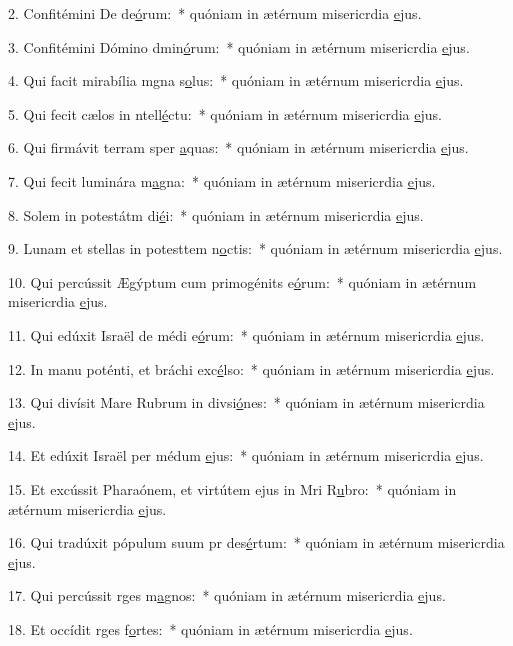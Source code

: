 2. Confitémini De de\uline{ó}rum:~* quóniam in ætérnum misericrdia \uline{e}jus.\par 
3. Confitémini Dómino dmin\uline{ó}rum:~* quóniam in ætérnum misericrdia \uline{e}jus.\par 
4. Qui facit mirabília mgna s\uline{o}lus:~* quóniam in ætérnum misericrdia \uline{e}jus.\par 
5. Qui fecit cælos in ntell\uline{é}ctu:~* quóniam in ætérnum misericrdia \uline{e}jus.\par 
6. Qui firmávit terram sper \uline{a}quas:~* quóniam in ætérnum misericrdia \uline{e}jus.\par 
7. Qui fecit luminára m\uline{a}gna:~* quóniam in ætérnum misericrdia \uline{e}jus.\par 
8. Solem in potestátm di\uline{é}i:~* quóniam in ætérnum misericrdia \uline{e}jus.\par 
9. Lunam et stellas in potesttem n\uline{o}ctis:~* quóniam in ætérnum misericrdia \uline{e}jus.\par 
10. Qui percússit Ægýptum cum primogénits e\uline{ó}rum:~* quóniam in ætérnum misericrdia \uline{e}jus.\par 
11. Qui edúxit Israël de médi e\uline{ó}rum:~* quóniam in ætérnum misericrdia \uline{e}jus.\par 
12. In manu poténti, et bráchi exc\uline{é}lso:~* quóniam in ætérnum misericrdia \uline{e}jus.\par 
13. Qui divísit Mare Rubrum in divsi\uline{ó}nes:~* quóniam in ætérnum misericrdia \uline{e}jus.\par 
14. Et edúxit Israël per médum \uline{e}jus:~* quóniam in ætérnum misericrdia \uline{e}jus.\par 
15. Et excússit Pharaónem, et virtútem ejus in Mri R\uline{u}bro:~* quóniam in ætérnum misericrdia \uline{e}jus.\par 
16. Qui tradúxit pópulum suum pr des\uline{é}rtum:~* quóniam in ætérnum misericrdia \uline{e}jus.\par 
17. Qui percússit rges m\uline{a}gnos:~* quóniam in ætérnum misericrdia \uline{e}jus.\par 
18. Et occídit rges f\uline{o}rtes:~* quóniam in ætérnum misericrdia \uline{e}jus.\par 
